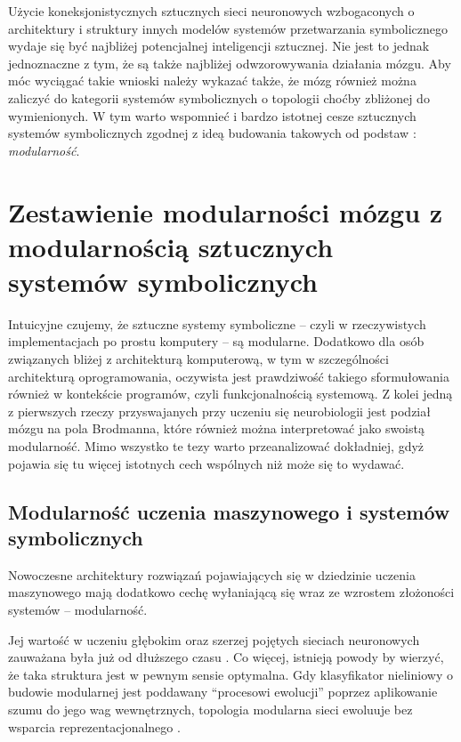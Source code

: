 Użycie koneksjonistycznych sztucznych sieci neuronowych wzbogaconych o architektury i struktury innych modelów systemów przetwarzania symbolicznego wydaje się być najbliżej potencjalnej inteligencji sztucznej.
Nie jest to jednak jednoznaczne z tym, że są także najbliżej odwzorowywania działania mózgu.
Aby móc wyciągać takie wnioski należy wykazać także, że mózg również można zaliczyć do kategorii systemów symbolicznych o topologii choćby zbliżonej do wymienionych.
W tym warto wspomnieć i bardzo istotnej cesze sztucznych systemów symbolicznych zgodnej z ideą budowania takowych od podstaw \cite{bechtel1993case} : \emph{modularność}.

\section{Zestawienie modularności mózgu z modularnością sztucznych systemów symbolicznych}

Intuicyjne czujemy, że sztuczne systemy symboliczne -- czyli w rzeczywistych implementacjach po prostu komputery -- są modularne.
Dodatkowo dla osób związanych bliżej z architekturą komputerową, w tym w szczególności architekturą oprogramowania, oczywista jest prawdziwość takiego sformułowania również w kontekście programów, czyli funkcjonalnością systemową.
Z kolei jedną z pierwszych rzeczy przyswajanych przy uczeniu się neurobiologii jest podział mózgu na pola Brodmanna, które również można interpretować jako swoistą modularność.
Mimo wszystko te tezy warto przeanalizować dokładniej, gdyż pojawia się tu więcej istotnych cech wspólnych niż może się to wydawać.

\subsection{Modularność uczenia maszynowego i systemów symbolicznych}

Nowoczesne architektury rozwiązań pojawiających się w dziedzinie uczenia maszynowego mają dodatkowo cechę wyłaniającą się wraz ze wzrostem złożoności systemów -- modularność.

Jej wartość w uczeniu głębokim oraz szerzej pojętych sieciach neuronowych zauważana była już od dłuższego czasu \cite{schmidt1998modularity}.
Co więcej, istnieją powody by wierzyć, że taka struktura jest w pewnym sensie optymalna.
Gdy klasyfikator nieliniowy o budowie modularnej jest poddawany ``procesowi ewolucji'' poprzez aplikowanie szumu do jego wag wewnętrznych, topologia modularna sieci ewoluuje bez wsparcia reprezentacjonalnego \cite{hoverstad2011noise}.


